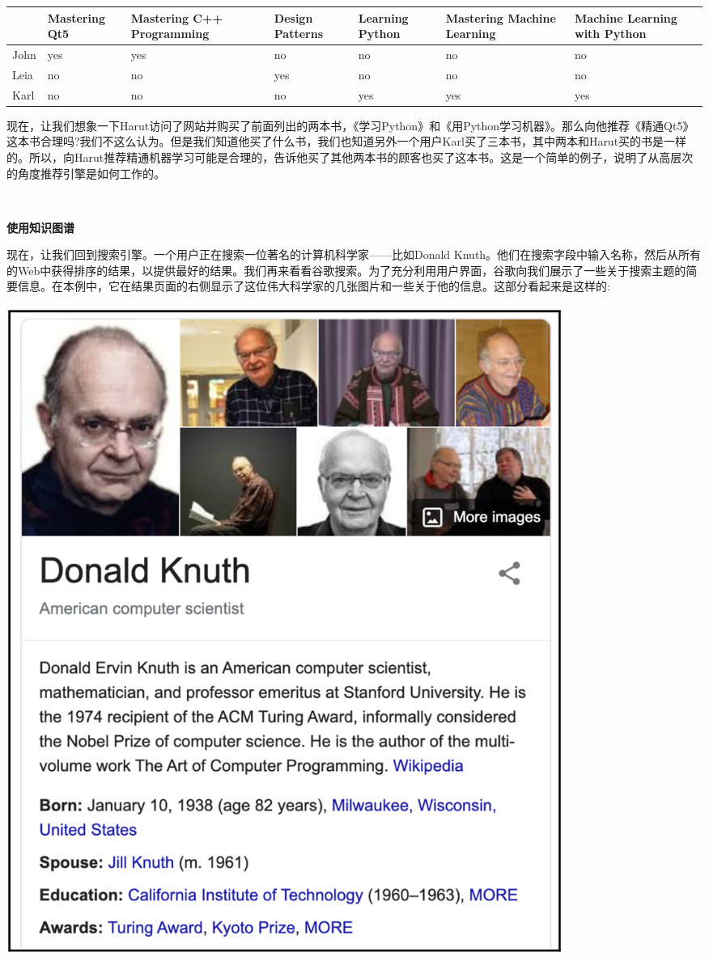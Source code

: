 \begin{table}[h]
	\begin{tabularx}{\textwidth}{|X|X|X|X|X|X|X|}
		\hline
		& Mastering Qt5 & Mastering	C++ Programming & Design	Patterns & Learning	Python & Mastering Machine Learning & Machine Learning with Python \\
		\hline
		John & yes & yes & no & no & no & no \\
		\hline
		Leia & no & no & yes & no & no & no \\
		\hline
		Karl & no & no & no & yes & yes & yes \\
		\hline
	\end{tabularx}
\end{table}

现在，让我们想象一下Harut访问了网站并购买了前面列出的两本书，《学习Python》和《用Python学习机器》。那么向他推荐《精通Qt5》这本书合理吗?我们不这么认为。但是我们知道他买了什么书，我们也知道另外一个用户Karl买了三本书，其中两本和Harut买的书是一样的。所以，向Harut推荐精通机器学习可能是合理的，告诉他买了其他两本书的顾客也买了这本书。这是一个简单的例子，说明了从高层次的角度推荐引擎是如何工作的。 \par

\noindent\textbf{}\ \par
\textbf{使用知识图谱} \ \par
现在，让我们回到搜索引擎。一个用户正在搜索一位著名的计算机科学家——比如Donald Knuth。他们在搜索字段中输入名称，然后从所有的Web中获得排序的结果，以提供最好的结果。我们再来看看谷歌搜索。为了充分利用用户界面，谷歌向我们展示了一些关于搜索主题的简要信息。在本例中，它在结果页面的右侧显示了这位伟大科学家的几张图片和一些关于他的信息。这部分看起来是这样的: \par

\begin{center}
	\includegraphics[width=0.8\textwidth]{content/Section-3/Chapter-16/8}
\end{center}

